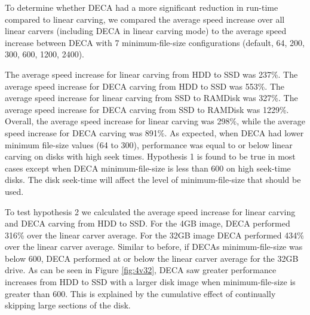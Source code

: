 \documentclass[10pt,a4paper]{article}
\begin{document}
To determine whether DECA had a more significant reduction in run-time compared to linear carving, we compared the average speed increase over all linear carvers (including DECA in linear carving mode) to the average speed increase between DECA with 7 minimum-file-size configurations (default, 64, 200, 300, 600, 1200, 2400).

The average speed increase for linear carving from HDD to SSD was 237\%. The average speed increase for DECA carving from HDD to SSD was 553\%. The average speed increase for linear carving from SSD to RAMDisk was 327\%. The average speed increase for DECA carving from SSD to RAMDisk was 1229\%. Overall, the average speed increase for linear carving was 298\%, while the average speed increase for DECA carving was 891\%. As expected, when DECA had lower minimum file-size values (64 to 300), performance was equal to or below linear carving on disks with high seek times. Hypothesis 1 is found to be true in most cases except when DECA minimum-file-size is less than 600 on high seek-time disks. The disk seek-time will affect the level of minimum-file-size that should be used.

%

To test hypothesis 2 we calculated the average speed increase for linear carving and DECA carving from HDD to SSD. For the 4GB image, DECA performed 316\% over the linear carver average. For the 32GB image DECA performed 434\% over the linear carver average. Similar to before, if DECAs minimum-file-size was below 600, DECA performed at or below the linear carver average for the 32GB drive. As can be seen in Figure \ref{fig:4v32}, DECA saw greater performance increases from HDD to SSD with a larger disk image when minimum-file-size is greater than 600. This is explained by the cumulative effect of continually skipping large sections of the disk. 
\end{document}
